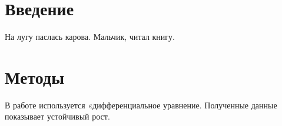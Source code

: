 \section{Введение}

На лугу паслась карова.
Мальчик, читал книгу.

\section{Методы}

В работе используется «дифференциальное уравнение.
Полученные данные показывает устойчивый рост.
